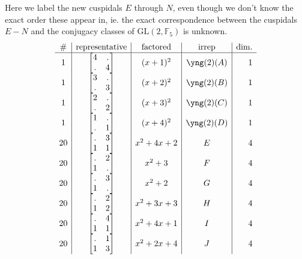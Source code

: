 \documentclass[11pt,oneside]{article}
\newcommand{\GL}{\mathrm{GL}}
\newcommand{\Field}{\mathbb{F}}
\begin{document}
Here we label the new cuspidals $E$ through $N$, even though we don't know
the exact order these appear in, ie.
the exact correspondence
between the cuspidals $E-N$ and the conjugacy classes of $\GL(2,\Field_5)$ is unknown.
$$
\begin{array}{c|c|c|c|r}
\#    &             \text{representative}  &  \text{factored} & \text{irrep} & \text{dim.}  \\
\hline
1  &  \begin{bmatrix}4&.\\.&4\end{bmatrix}   & (x+1)^2  & \yng(2)(A) & 1  \\
1  &  \begin{bmatrix}3&.\\.&3\end{bmatrix}   & (x+2)^2  & \yng(2)(B) & 1  \\
1  &  \begin{bmatrix}2&.\\.&2\end{bmatrix}   & (x+3)^2  & \yng(2)(C) & 1  \\
1  &  \begin{bmatrix}1&.\\.&1\end{bmatrix}   & (x+4)^2  & \yng(2)(D) & 1  \\
20  &  \begin{bmatrix}.&3\\1&1\end{bmatrix}   & x^2+4x+2  & E & 4  \\
20  &  \begin{bmatrix}.&2\\1&.\end{bmatrix}   & x^2+3     & F & 4  \\
20  &  \begin{bmatrix}.&3\\1&.\end{bmatrix}   & x^2+2     & G & 4  \\
20  &  \begin{bmatrix}.&2\\1&2\end{bmatrix}   & x^2+3x+3  & H & 4  \\
20  &  \begin{bmatrix}.&4\\1&1\end{bmatrix}   & x^2+4x+1  & I & 4  \\
20  &  \begin{bmatrix}.&1\\1&3\end{bmatrix}   & x^2+2x+4  & J & 4  \\

\end{array}$$
\end{document}

